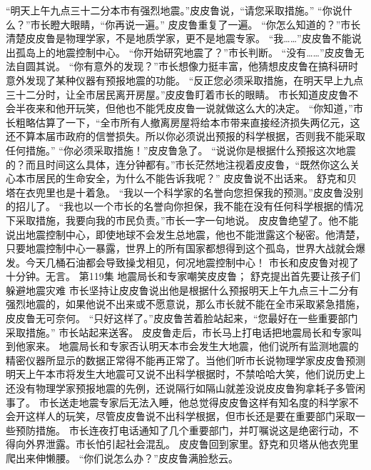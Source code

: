 \documentclass[a4paper,12pt,UTF8,twoside]{ctexbook}
\begin{document}
        “明天上午九点三十二分本市有强烈地震。”皮皮鲁说，“请您采取措施。” 
        “你说什么？”市长瞪大眼睛，“你再说一遍。” 
        皮皮鲁重复了一遍。 
        “你怎么知道的？”市长清楚皮皮鲁是物理学家，不是地质学家，更不是地震专家。 
        “我……”皮皮鲁不能说出孤岛上的地震控制中心。 
        “你开始研究地震了？”市长判断。 
        “没有……”皮皮鲁无法自圆其说。 
        “你有意外的发现？”市长想像力挺丰富，他猜想皮皮鲁在搞科研时意外发现了某种仪器有预报地震的功能。 
        “反正您必须采取措施，在明天早上九点三十二分时，让全市居民离开房屋。”皮皮鲁盯着市长的眼睛。 
        市长知道皮皮鲁不会半夜来和他开玩笑，但他也不能凭皮皮鲁一说就做这么大的决定。 
        “你知道，”市长粗略估算了一下，“全市所有人撤离房屋将给本市带来直接经济损失两亿元，这还不算本届市政府的信誉损失。所以你必须说出预报的科学根据，否则我不能采取任何措施。” 
        “你必须采取措施！”皮皮鲁急了。 
        “说说你是根据什么预报这次地震的？而且时间这么具体，连分钟都有。”市长茫然地注视着皮皮鲁，“既然你这么关心本市居民的生命安全，为什么不能告诉我呢？” 
        皮皮鲁说不出话来。 
        舒克和贝塔在衣兜里也是十着急。 
        “我以一个科学家的名誉向您担保我的预测。”皮皮鲁没别的招儿了。 
        “我也以一个市长的名誉向你担保，我不能在没有任何科学根据的情况下采取措施，我要向我的市民负责。”市长一字一句地说。 
        皮皮鲁绝望了。他不能说出地震控制中心，即使地球不会发生总地震，他也不能泄露这个秘密。他清楚，只要地震控制中心一暴露，世界上的所有国家都想得到这个孤岛，世界大战就会爆发。今天几桶石油都会导致操戈相见，何况地震控制中心！ 
        市长和皮皮鲁对视了十分钟。无言。   第119集 
        地震局长和专家嘲笑皮皮鲁； 
        舒克提出首先要让孩子们躲避地震灾难   
        市长坚持让皮皮鲁说出他是根据什么预报明天上午九点三十二分有强烈地震的，如果他说不出来或不愿意说，那么市长就不能在全市采取紧急措施，皮皮鲁无可奈何。 
        “只好这样了。”皮皮鲁苦着脸站起来，“您最好在一些重要部门采取措施。” 
        市长站起来送客。 
        皮皮鲁走后，市长马上打电话把地震局长和专家叫到他家来。 
        地震局长和专家否认明天本市会发生大地震，他们说所有监测地震的精密仪器所显示的数据正常得不能再正常了。当他们听市长说物理学家皮皮鲁预测明天上午本市将发生大地震可又说不出科学根据时，不禁哈哈大笑，他们说历史上还没有物理学家预报地震的先例，还说隔行如隔山就差没说皮皮鲁狗拿耗子多管闲事了。 
        市长送走地震专家后无法入睡，他总觉得皮皮鲁这样有知名度的科学家不会开这样人的玩笑，尽管皮皮鲁说不出科学根据，但市长还是要在重要部门采取一些预防措施。 
        市长连夜打电话通知了几个重要部门，并叮嘱说这是绝密行动，不得向外界泄露。市长怕引起社会混乱。 
        皮皮鲁回到家里。舒克和贝塔从他衣兜里爬出来伸懒腰。 
        “你们说怎么办？”皮皮鲁满脸愁云。 
\end{document}
